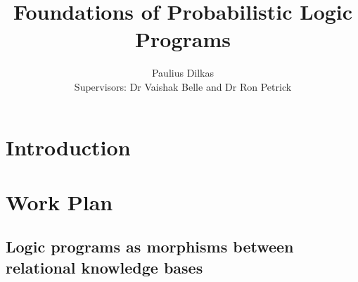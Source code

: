 \documentclass{article}
\title{Foundations of Probabilistic Logic Programs}
\author{Paulius Dilkas \\[1ex] {\small Supervisors: Dr Vaishak Belle and Dr Ron
    Petrick}}
\affil{School of Informatics, University of Edinburgh}
\begin{document}
\maketitle

\section{Introduction}


\section{Work Plan}




\subsection{Logic programs as morphisms between relational knowledge bases}
\end{document}
